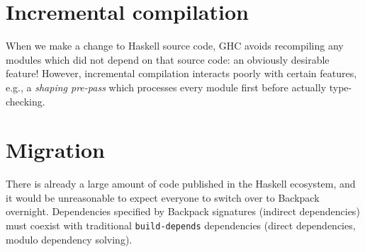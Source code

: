 \section{Incremental compilation}

When we make a change to Haskell source code, GHC avoids recompiling
any modules which did not depend on that source code: an obviously
desirable feature!  However, incremental compilation interacts
poorly with certain features, e.g., a \emph{shaping pre-pass} which
processes every module first before actually type-checking.


\section{Migration}

There is already a large amount of code published in the Haskell
ecosystem, and it would be unreasonable to expect everyone to switch
over to Backpack overnight.  Dependencies specified by Backpack
signatures (indirect dependencies) must coexist with traditional
\verb|build-depends| dependencies (direct dependencies, modulo
dependency solving).
